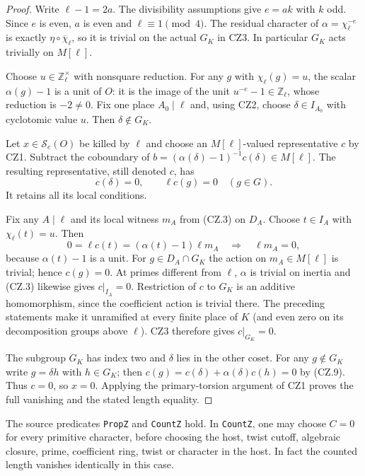 \begin{proof}
Write $\ell-1=2a$.  The divisibility assumptions give
$e=ak$ with $k$ odd.  Since $e$ is even, $a$ is even and
$\ell\equiv1\pmod4$.  The residual character of
$\alpha=\chi_\ell^{-e}$ is exactly
$\eta\circ\overline\chi_\ell$, so it is trivial on the
actual $G_K$ in CZ3.  In particular $G_K$ acts trivially on
$M[\ell]$.

Choose $u\in\mathbb Z_\ell^\times$ with nonsquare reduction.
For any $g$ with $\chi_\ell(g)=u$, the scalar
$\alpha(g)-1$ is a unit of $O$: it is the image of the unit
$u^{-e}-1\in\mathbb Z_\ell$, whose reduction is $-2\ne0$.
Fix one place $A_0\mid\ell$ and, using CZ2, choose
$\delta\in I_{A_0}$ with cyclotomic value $u$.  Then
$\delta\notin G_K$.

Let $x\in\mathcal S_e(O)$ be killed by $\ell$ and choose an
$M[\ell]$-valued representative $c$ by CZ1.  Subtract the
coboundary of
$b=(\alpha(\delta)-1)^{-1}c(\delta)\in M[\ell]$.
The resulting representative, still denoted $c$, has
\[
                  c(\delta)=0,\qquad \ell c(g)=0
                  \quad(g\in G).
                  \tag{CZ.9}
\]
It retains all its local conditions.

Fix any $A\mid\ell$ and its local witness $m_A$ from (CZ.3)
on $D_A$.  Choose $t\in I_A$ with $\chi_\ell(t)=u$.
Then
\[
       0=\ell c(t)=(\alpha(t)-1)\ell m_A
       \quad\Longrightarrow\quad \ell m_A=0,
       \tag{CZ.10}
\]
because $\alpha(t)-1$ is a unit.  For $g\in D_A\cap G_K$
the action on $m_A\in M[\ell]$ is trivial; hence
$c(g)=0$.  At primes different from $\ell$, $\alpha$ is
trivial on inertia and (CZ.3) likewise gives $c|_{I_A}=0$.
Restriction of $c$ to $G_K$ is an additive homomorphism, since
the coefficient action is trivial there.  The preceding statements
make it unramified at every finite place of $K$ (and even zero
on its decomposition groups above $\ell$).  CZ3 therefore gives
$c|_{G_K}=0$.

The subgroup $G_K$ has index two and $\delta$ lies in the other
coset.  For any $g\notin G_K$ write $g=\delta h$ with
$h\in G_K$; then
$c(g)=c(\delta)+\alpha(\delta)c(h)=0$ by (CZ.9).
Thus $c=0$, so $x=0$.  Applying the primary-torsion argument
of CZ1 proves the full vanishing and the stated length equality.
\end{proof}

\begin{theorem}
\label{thm:cz-count-z}
The source predicates \texttt{PropZ} and \texttt{CountZ} hold.
In \texttt{CountZ}, one may choose $C=0$ for every primitive
character, before choosing the host, twist cutoff, algebraic
closure, prime, coefficient ring, twist or character in the host.
In fact the counted length vanishes identically in this case.
\end{theorem}

